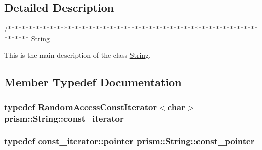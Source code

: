 \subsection{Detailed Description}
/$\ast$$\ast$$\ast$$\ast$$\ast$$\ast$$\ast$$\ast$$\ast$$\ast$$\ast$$\ast$$\ast$$\ast$$\ast$$\ast$$\ast$$\ast$$\ast$$\ast$$\ast$$\ast$$\ast$$\ast$$\ast$$\ast$$\ast$$\ast$$\ast$$\ast$$\ast$$\ast$$\ast$$\ast$$\ast$$\ast$$\ast$$\ast$$\ast$$\ast$$\ast$$\ast$$\ast$$\ast$$\ast$$\ast$$\ast$$\ast$$\ast$$\ast$$\ast$$\ast$$\ast$$\ast$$\ast$$\ast$$\ast$$\ast$$\ast$$\ast$$\ast$$\ast$$\ast$$\ast$$\ast$$\ast$$\ast$$\ast$$\ast$$\ast$$\ast$$\ast$$\ast$$\ast$$\ast$$\ast$$\ast$$\ast$ \hyperlink{classprism_1_1_string}{String}

This is the main description of the class \hyperlink{classprism_1_1_string}{String}. 

\subsection{Member Typedef Documentation}
\subsubsection[{\texorpdfstring{const\+\_\+iterator}{const_iterator}}]{\setlength{\rightskip}{0pt plus 5cm}typedef {\bf Random\+Access\+Const\+Iterator}$<$char$>$ {\bf prism\+::\+String\+::const\+\_\+iterator}}\hypertarget{classprism_1_1_string_a8b46f0fbe9c5c94ba892975242e3ab68}{}\label{classprism_1_1_string_a8b46f0fbe9c5c94ba892975242e3ab68}
\subsubsection[{\texorpdfstring{const\+\_\+pointer}{const_pointer}}]{\setlength{\rightskip}{0pt plus 5cm}typedef {\bf const\+\_\+iterator\+::pointer} {\bf prism\+::\+String\+::const\+\_\+pointer}}\hypertarget{classprism_1_1_string_adbea4cbf0f4f62948eb2accf7d402456}{}\label{classprism_1_1_string_adbea4cbf0f4f62948eb2accf7d402456}
